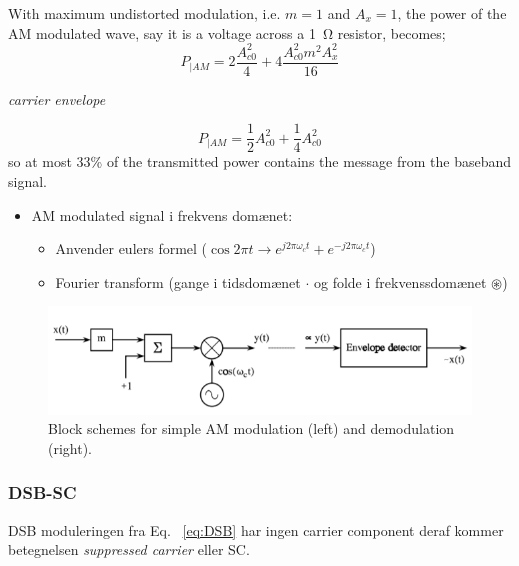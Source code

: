 \begin{mdframed}[style=exampledefault]
With maximum undistorted modulation, i.e. $m=1$ and $A_x = 1$, the power of the AM modulated wave, say it is a voltage across a \SI{1}{\ohm} resistor, becomes;\\
\begin{equation}\label{eq:AM_ex1}
P_{|AM} = 2 \dfrac{A_{c0}^2}{4} + 4 \dfrac{A_{c0}^2 m^2 A_x^2}{16}
\end{equation}
\begin{center}
	\textit{carrier \qquad envelope}
\end{center}

\begin{equation}\label{eq:ex2}
P_{|AM} = \dfrac{1}{2}A_{c0}^2 + \dfrac{1}{4}A_{c0}^2
\end{equation}
so at most 33\% of the transmitted power contains the message from the baseband signal.
\end{mdframed}

\begin{itemize}
	\item AM modulated signal i frekvens domænet:
	\begin{itemize}
		\item Anvender eulers formel ($\cos 2\pi t \rightarrow e^{j2\pi\omega_c t}+e^{-j2\pi\omega_c t}$)
		\item Fourier transform (gange i tidsdomænet $\cdot$ og folde i frekvenssdomænet $\circledast$) 
	\end{itemize}
\end{itemize}

\begin{figure} [H]
	\centering
	\includegraphics[width=\linewidth]{graphics/6.png}
	\caption{ Block schemes for simple AM modulation (left) and demodulation (right).}
	\label{fig:6}
\end{figure}


\subsubsection{DSB-SC}
DSB moduleringen fra Eq. ~\ref{eq:DSB} har ingen carrier component deraf kommer betegnelsen \textit{suppressed carrier} eller SC.

